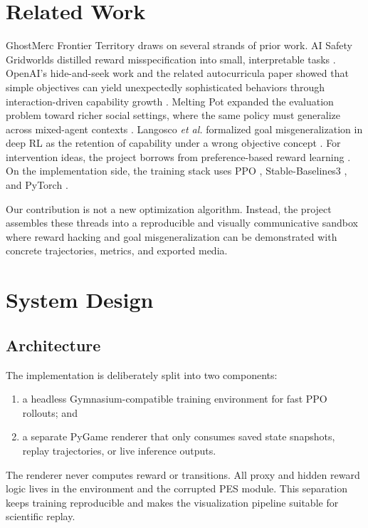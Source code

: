 \documentclass[conference]{IEEEtran}
\begin{document}
\section{Related Work}
GhostMerc Frontier Territory draws on several strands of prior work. AI Safety Gridworlds distilled reward misspecification into small, interpretable tasks \cite{leike2017gridworlds}. OpenAI's hide-and-seek work and the related autocurricula paper showed that simple objectives can yield unexpectedly sophisticated behaviors through interaction-driven capability growth \cite{baker2019tool,openai2019toolblog}. Melting Pot expanded the evaluation problem toward richer social settings, where the same policy must generalize across mixed-agent contexts \cite{agapiou2021meltingpot}. Langosco \emph{et al.} formalized goal misgeneralization in deep RL as the retention of capability under a wrong objective concept \cite{langosco2022gmg}. For intervention ideas, the project borrows from preference-based reward learning \cite{christiano2017preferences}. On the implementation side, the training stack uses PPO \cite{schulman2017ppo}, Stable-Baselines3 \cite{raffin2021sb3}, and PyTorch \cite{paszke2019pytorch}.

Our contribution is not a new optimization algorithm. Instead, the project assembles these threads into a reproducible and visually communicative sandbox where reward hacking and goal misgeneralization can be demonstrated with concrete trajectories, metrics, and exported media.

\section{System Design}
\subsection{Architecture}
The implementation is deliberately split into two components:
\begin{enumerate}
    \item a headless Gymnasium-compatible training environment for fast PPO rollouts; and
    \item a separate PyGame renderer that only consumes saved state snapshots, replay trajectories, or live inference outputs.
\end{enumerate}
The renderer never computes reward or transitions. All proxy and hidden reward logic lives in the environment and the corrupted PES module. This separation keeps training reproducible and makes the visualization pipeline suitable for scientific replay.
\end{document}

